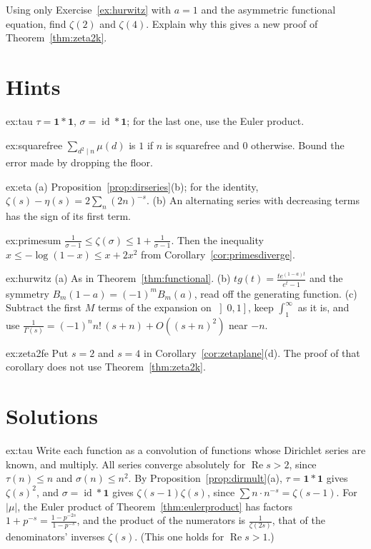 \begin{exercise}[$\star\star$]\label{ex:zeta2fe}
Using only Exercise~\ref{ex:hurwitz} with $a=1$ and the asymmetric functional equation, find $\zeta(2)$ and $\zeta(4)$. Explain why this gives a new proof
of Theorem~\ref{thm:zeta2k}.
\end{exercise}

\section{Hints}

\begin{hint}{ex:tau}
$\tau=\mathbf 1*\mathbf 1$, $\sigma=\operatorname{id}*\mathbf 1$; for the last one, use the Euler product.
\end{hint}
\begin{hint}{ex:squarefree}
$\sum_{d^2\mid n}\mu(d)$ is $1$ if $n$ is squarefree and $0$ otherwise. Bound the error made by dropping the floor.
\end{hint}
\begin{hint}{ex:eta}
(a) Proposition~\ref{prop:dirseries}(b); for the identity, $\zeta(s)-\eta(s)=2\sum_n(2n)^{-s}$. (b) An alternating series with decreasing terms has the sign of its
first term.
\end{hint}
\begin{hint}{ex:primesum}
$\frac1{\sigma-1}\le\zeta(\sigma)\le1+\frac1{\sigma-1}$. Then the inequality $x\le-\log(1-x)\le x+2x^2$ from Corollary~\ref{cor:primesdiverge}.
\end{hint}
\begin{hint}{ex:hurwitz}
(a) As in Theorem~\ref{thm:functional}. (b) $tg(t)=\frac{te^{(1-a)t}}{e^t-1}$ and the symmetry $B_m(1-a)=(-1)^mB_m(a)$, read off the generating function. (c) Subtract the first $M$
terms of the expansion on $\left]0,1\right]$, keep $\int_1^\infty$ as it is, and use $\frac1{\Gamma(s)}=(-1)^nn!\,(s+n)+O((s+n)^2)$ near $-n$.
\end{hint}
\begin{hint}{ex:zeta2fe}
Put $s=2$ and $s=4$ in Corollary~\ref{cor:zetaplane}(d). The proof of that corollary does not use Theorem~\ref{thm:zeta2k}.
\end{hint}

\section{Solutions}

\begin{solution}{ex:tau}
\idea Write each function as a convolution of functions whose Dirichlet series are known, and multiply.
\writeup All series converge absolutely for $\operatorname{Re}s>2$, since $\tau(n)\le n$ and $\sigma(n)\le n^2$. By Proposition~\ref{prop:dirmult}(a), $\tau=\mathbf 1*\mathbf 1$ gives $\zeta(s)^2$, and
$\sigma=\operatorname{id}*\mathbf 1$ gives $\zeta(s-1)\zeta(s)$, since $\sum n\cdot n^{-s}=\zeta(s-1)$. For $|\mu|$, the Euler product of Theorem~\ref{thm:eulerproduct} has factors $1+p^{-s}=\frac{1-p^{-2s}}{1-p^{-s}}$,
and the product of the numerators is $\frac1{\zeta(2s)}$, that of the denominators' inverses $\zeta(s)$. (This one holds for $\operatorname{Re}s>1$.)
\end{solution}

